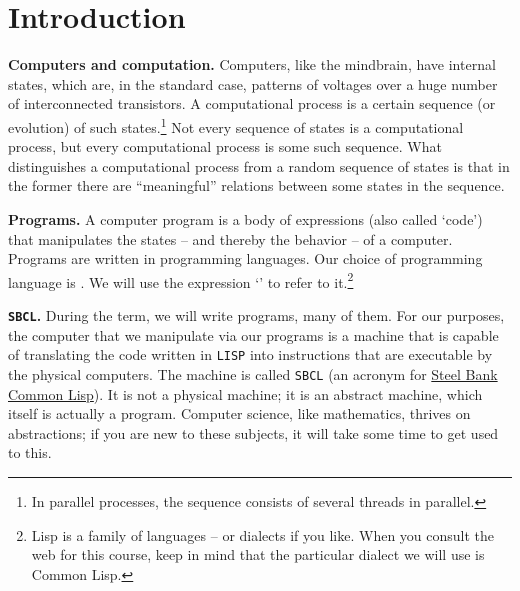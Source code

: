 \documentclass[a4paper,11pt]{article}
\begin{document}

\section{Introduction}

\begin{uenum}
\item
{\bf Computers and computation.}
 Computers, like the mindbrain, have internal states, which are, in the standard case, patterns of voltages over a huge number of interconnected transistors. A computational process is a certain sequence (or evolution) of such states.\footnote{In parallel processes, the sequence consists of several threads in parallel.} Not every sequence of states is a computational process, but every computational process is some such sequence. What distinguishes a computational process from a random sequence of states is that in the former there are ``meaningful'' relations between some states in the sequence.

\item
{\bf Programs.} A computer program is a body of expressions (also
called `code') that manipulates the states -- and thereby the behavior
-- of a computer. Programs are written in programming languages. Our
choice of programming language is . We will use the
expression `' to refer to it.\footnote{Lisp is a family of languages -- or dialects if you like. When you consult the web for this course, keep in mind that the particular dialect we will use is Common Lisp.}

\item {\bf \Verb+SBCL+.} During the term, we will write programs, many of them. For our purposes, the computer that we manipulate via our programs is a machine that is capable of translating the code written in \Verb+LISP+ into instructions that are executable by the physical computers. The machine is called \Verb+SBCL+ (an acronym for \href{http://www.sbcl.org/}{Steel Bank Common Lisp}). It is not a physical machine; it is an abstract machine, which itself is actually a program. Computer science, like mathematics, thrives on abstractions; if you are new to these subjects, it will take some time to get used to this.%


\end{uenum}
\end{document}
